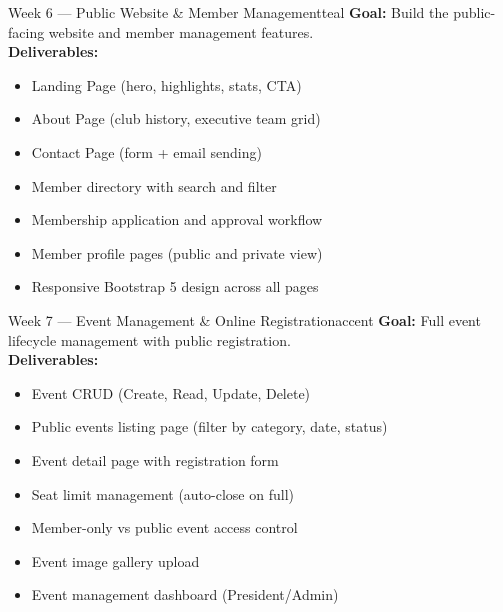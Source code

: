 \documentclass[12pt,a4paper]{article}
\begin{document}
\begin{weekbox}{Week 6 --- Public Website \& Member Management}{teal}
\textbf{Goal:} Build the public-facing website and member management features.\\[6pt]
\textbf{Deliverables:}
\begin{itemize}[leftmargin=*, itemsep=2pt]
  \item Landing Page (hero, highlights, stats, CTA)
  \item About Page (club history, executive team grid)
  \item Contact Page (form + email sending)
  \item Member directory with search and filter
  \item Membership application and approval workflow
  \item Member profile pages (public and private view)
  \item Responsive Bootstrap 5 design across all pages
\end{itemize}
\end{weekbox}

\vspace{8pt}

\begin{weekbox}{Week 7 --- Event Management \& Online Registration}{accent}
\textbf{Goal:} Full event lifecycle management with public registration.\\[6pt]
\textbf{Deliverables:}
\begin{itemize}[leftmargin=*, itemsep=2pt]
  \item Event CRUD (Create, Read, Update, Delete)
  \item Public events listing page (filter by category, date, status)
  \item Event detail page with registration form
  \item Seat limit management (auto-close on full)
  \item Member-only vs public event access control
  \item Event image gallery upload
  \item Event management dashboard (President/Admin)
\end{itemize}
\end{weekbox}

\vspace{8pt}
\end{document}
